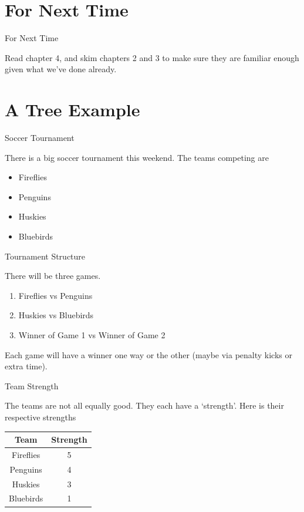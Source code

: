 \documentclass[
  ignorenonframetext,
]{beamer}
\providecommand{\tightlist}{%
  \setlength{\itemsep}{0pt}\setlength{\parskip}{0pt}}
\renewcommand{\,}{\text{, }}
\begin{document}
\hypertarget{for-next-time}{%
\section{For Next Time}\label{for-next-time}}

\begin{frame}{For Next Time}
\protect\hypertarget{for-next-time-1}{}

Read chapter 4, and skim chapters 2 and 3 to make sure they are familiar
enough given what we've done already.

\end{frame}

\hypertarget{a-tree-example}{%
\section{A Tree Example}\label{a-tree-example}}

\begin{frame}{Soccer Tournament}
\protect\hypertarget{soccer-tournament}{}

There is a big soccer tournament this weekend. The teams competing are

\begin{itemize}
\tightlist
\item
  Fireflies
\item
  Penguins
\item
  Huskies
\item
  Bluebirds
\end{itemize}

\end{frame}

\begin{frame}{Tournament Structure}
\protect\hypertarget{tournament-structure}{}

There will be three games.

\begin{enumerate}
\tightlist
\item
  Fireflies vs Penguins
\item
  Huskies vs Bluebirds
\item
  Winner of Game 1 vs Winner of Game 2
\end{enumerate}

Each game will have a winner one way or the other (maybe via penalty
kicks or extra time).

\end{frame}

\begin{frame}{Team Strength}
\protect\hypertarget{team-strength}{}

The teams are not all equally good. They each have a `strength'. Here is
their respective strengths

\begin{longtable}[]{@{}cc@{}}
\toprule
Team & Strength\tabularnewline
\midrule
\endhead
Fireflies & 5\tabularnewline
Penguins & 4\tabularnewline
Huskies & 3\tabularnewline
Bluebirds & 1\tabularnewline
\bottomrule
\end{longtable}

\end{frame}
\end{document}
